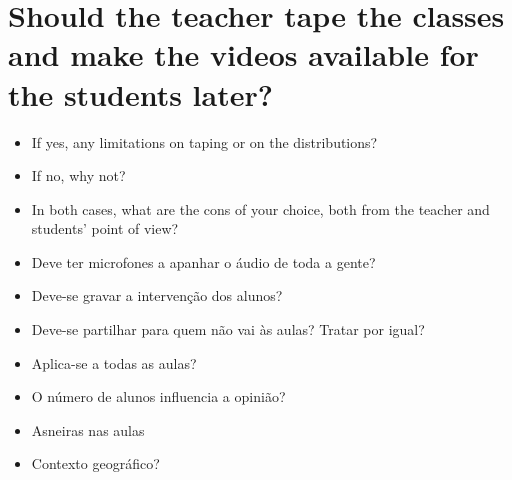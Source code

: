 \documentclass[portuguese, 11pt, a4paper, titlepage, oneside]{article}
\begin{document}
\section{Should the teacher tape the classes and make the videos available for the students later?}
\begin{itemize}
  \item If yes, any limitations on taping or on the distributions?
  \item If no, why not?
  \item In both cases, what are the cons of your choice, both from the teacher and students' point of view?
  \item Deve ter microfones a apanhar o áudio de toda a gente?
  \item Deve-se gravar a intervenção dos alunos?
  \item Deve-se partilhar para quem não vai às aulas? Tratar por igual?
  \item Aplica-se a todas as aulas?
  \item O número de alunos influencia a opinião?
  \item Asneiras nas aulas
  \item Contexto geográfico?
\end{itemize}
\end{document}
